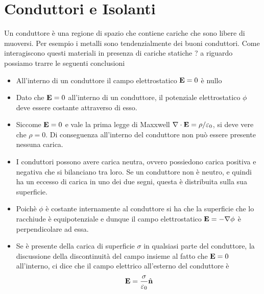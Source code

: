 \section{Conduttori e Isolanti}


Un conduttore \`e una regione di spazio che contiene cariche che sono libere di muoversi. Per esempio i metalli sono tendenzialmente dei buoni conduttori. Come interagiscono questi materiali in presenza di cariche statiche ? a riguardo possiamo trarre le seguenti conclusioni
\begin{itemize}
	\item All'interno di un conduttore il campo elettrostatico $\bold{E} = 0$ \`e nullo
	\item Dato che $\bold{E}  = 0$ all'interno di un conduttore, il potenziale elettrostatico $\phi$ deve essere costante attraverso di esso.
	\item Siccome $\bold{E} = 0$ e vale la prima legge di Maxxwell $\nabla \cdot \bold{E} = \rho  \slash  \varepsilon_0$, si deve vere che $\rho = 0$. Di conseguenza all'interno del conduttore non pu\`o essere presente nessuna carica.
	\item I conduttori possono avere carica neutra, ovvero possiedono carica positiva e negativa che si bilanciano tra loro. Se un conduttore non \`e neutro, e quindi ha un eccesso di carica in uno dei due segni, questa \`e distribuita sulla sua superficie.
	\item Poich\`e $\phi$ \`e costante internamente al conduttore si ha che la superficie che lo racchiude \`e equipotenziale e dunque il campo elettrostatico $\bold{E} = - \nabla \phi$ \`e perpendicolare ad essa.
	\item Se \`e presente della carica di superficie $\sigma $ in qualsiasi parte del conduttore, la discussione della discontinuit\`a del campo insieme al fatto che $\bold{E} = 0$ all'interno, ci dice che il campo elettrico all'esterno del conduttore \`e 
	\begin{equation*}
		\bold{E} = \frac{\sigma}{\varepsilon_0} \hat{\bold{n}}
	\end{equation*}
\end{itemize}

